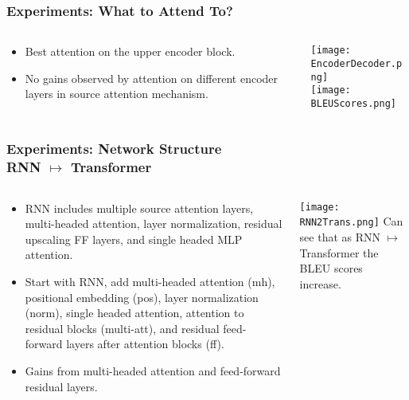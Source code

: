 \begin{frame}
    \frametitle{Experiments: What to Attend To?}
    \begin{columns}
        \begin{column}{0.55\paperwidth}
            \begin{itemize}
                \item Best attention on the upper encoder block. 
                \item No gains observed by attention on different encoder layers
                    in source attention mechanism.
            \end{itemize}
        \end{column}
        \begin{column}{0.4\paperwidth}
            \vspace{-1em}
            \texttt{[image: EncoderDecoder.png]}\\
            \texttt{[image: BLEUScores.png]}\\
            \vspace{-1.5em}
        \end{column}
    \end{columns}
\end{frame}

\begin{frame}
    \frametitle{Experiments: Network Structure\\\small{\vspace{-1.5em}RNN
    $\mapsto$ Transformer}}
    \begin{columns}
        \begin{column}{0.55\paperwidth}
            \vspace{-1em}
            \begin{itemize}
                \item RNN includes multiple source attention layers,
                    multi-headed attention, layer normalization, residual
                    upscaling FF layers, and single headed MLP attention.
                \item Start with RNN, add multi-headed attention (mh),
                    positional embedding (pos), layer normalization (norm),
                    single headed attention, attention to residual blocks 
                    (multi-att), and residual feed-forward layers after
                    attention blocks (ff).
                \item Gains from multi-headed attention and feed-forward
                    residual layers.
            \end{itemize}
        \end{column}
        \begin{column}{0.4\paperwidth}
            \texttt{[image: RNN2Trans.png]}
            Can see that as RNN $\mapsto$ Transformer the BLEU scores increase.
        \end{column}
    \end{columns}
\end{frame}

